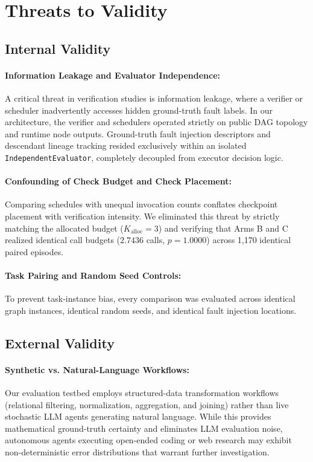 \section{Threats to Validity}
\label{sec:threats_to_validity}

\subsection{Internal Validity}
\paragraph{Information Leakage and Evaluator Independence:}
A critical threat in verification studies is information leakage, where a verifier or scheduler inadvertently accesses hidden ground-truth fault labels. In our architecture, the verifier and schedulers operated strictly on public DAG topology and runtime node outputs. Ground-truth fault injection descriptors and descendant lineage tracking resided exclusively within an isolated \texttt{IndependentEvaluator}, completely decoupled from executor decision logic.

\paragraph{Confounding of Check Budget and Check Placement:}
Comparing schedules with unequal invocation counts conflates checkpoint placement with verification intensity. We eliminated this threat by strictly matching the allocated budget ($K_{\text{alloc}} = 3$) and verifying that Arms B and C realized identical call budgets ($2.7436$ calls, $p = 1.0000$) across 1,170 identical paired episodes.

\paragraph{Task Pairing and Random Seed Controls:}
To prevent task-instance bias, every comparison was evaluated across identical graph instances, identical random seeds, and identical fault injection locations.

\subsection{External Validity}
\paragraph{Synthetic vs. Natural-Language Workflows:}
Our evaluation testbed employs structured-data transformation workflows (relational filtering, normalization, aggregation, and joining) rather than live stochastic LLM agents generating natural language. While this provides mathematical ground-truth certainty and eliminates LLM evaluation noise, autonomous agents executing open-ended coding or web research may exhibit non-deterministic error distributions that warrant further investigation.

